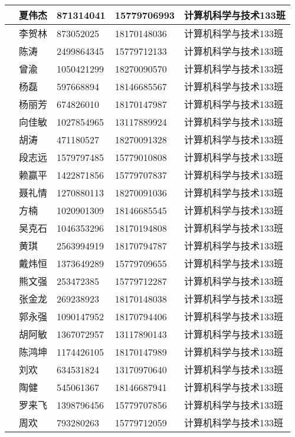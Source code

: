 \documentclass[12pt,a4paper]{article}
\begin{document}
\begin{CJK}{UTF8}{gbsn}
\begin{flushleft}
\begin{longtable}{|l|l|l|l|l|}
           & 夏伟杰         & 871314041  & 15779706993 & 计算机科学与技术133班 \\ \hline
           & 李贺林         & 873052025  & 18170148036 & 计算机科学与技术133班 \\ \hline
           & 陈涛           & 2499864345 & 15779712133 & 计算机科学与技术133班 \\ \hline
           & 曾渝           & 1050421299 & 18270090570 & 计算机科学与技术133班 \\ \hline
           & 杨磊           & 597668894  & 18146685567 & 计算机科学与技术133班 \\ \hline
           & 杨丽芳         & 674826010  & 18170147987 & 计算机科学与技术133班 \\ \hline
           & 向佳敏         & 1027854965 & 13117889924 & 计算机科学与技术133班 \\ \hline
           & 胡涛           & 471180527  & 18270091328 & 计算机科学与技术133班 \\ \hline
           & 段志远         & 1579797485 & 15779010808 & 计算机科学与技术133班 \\ \hline
           & 赖赢平         & 1422871856 & 15779707837 & 计算机科学与技术133班 \\ \hline
           & 聂礼情         & 1270880113 & 18270091036 & 计算机科学与技术133班 \\ \hline
           & 方楠           & 1020901309 & 18146685545 & 计算机科学与技术133班 \\ \hline
           & 吴克石         & 1046353296 & 18170194808 & 计算机科学与技术133班 \\ \hline
           & 黄琪           & 2563994919 & 18170794787 & 计算机科学与技术133班 \\ \hline
           & 戴炜恒         & 1373649289 & 15779709655 & 计算机科学与技术133班 \\ \hline
           & 熊文强         & 253472385  & 15779712287 & 计算机科学与技术133班 \\ \hline
           & 张金龙         & 269238923  & 18170148038 & 计算机科学与技术133班 \\ \hline
           & 郭永强         & 1090147952 & 18170794406 & 计算机科学与技术133班 \\ \hline
           & 胡阿敏         & 1367072957 & 13117890143 & 计算机科学与技术133班 \\ \hline
           & 陈鸿坤         & 1174426105 & 18170147989 & 计算机科学与技术133班 \\ \hline
           & 刘欢           & 634531824  & 13170970640 & 计算机科学与技术133班 \\ \hline
           & 陶健           & 545061367  & 18146687941 & 计算机科学与技术133班 \\ \hline
           & 罗来飞         & 1398796456 & 15779707856 & 计算机科学与技术133班 \\ \hline
           & 周欢           & 793280263  & 15779712059 & 计算机科学与技术133班 \\ \hline


\end{longtable}
\end{flushleft}
\end{CJK}
\end{document}

